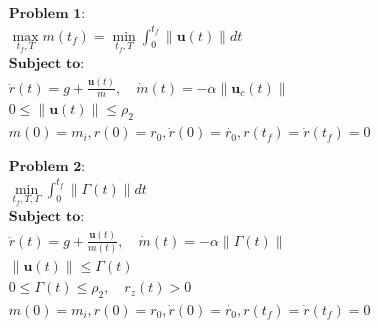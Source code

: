 \documentclass[conf]{new-aiaa}
\begin{document}
\begin{doublespace}
\begin{singlespace}
\begin{figure}
\begin{minipage}{0.5\textwidth}
	\begin{align*}
	& \textbf{Problem 1:} \\
	& \max_{t_f, T} m(t_f) = \min_{t_f, T}\int^{t_f}_0 \| \mathbf{u}(t)\| dt \\
	& \textbf{Subject to:} \\
	& \ddot{r}(t)= g + \frac{\boldsymbol u (t)}{m}, \quad \dot{m}(t)=-\alpha \| \mathbf{u}_c (t)\| \\
	& 0 \leq \lVert \mathbf{u} (t) \rVert \leq \rho_2 \\
	& m(0) = m_i, r(0) = r_0, \dot{r}(0) = \dot{r_0}, r(t_f) =\dot{r}(t_f) = 0
	\end{align*}
\end{minipage}
\begin{minipage}{0.5\textwidth}
	\begin{align*}
	& \textbf{Problem 2:} \\
	& \min_{t_f, T, \Gamma} \int^{t_f}_0 \| \Gamma(t) \| dt \\
	& \textbf{Subject to:} \\
	& \ddot{r}(t)= g + \frac{\mathbf{u} (t)}{m(t)}, \quad \dot{m}(t)=-\alpha \| \Gamma (t) \| \\
	& \| \mathbf{u}(t) \| \leq \Gamma(t) \\ 
	& 0 \leq \Gamma(t) \leq  \rho_2, \quad  r_z(t) > 0 \\
	& m(0) = m_i, r(0) = r_0, \dot{r}(0) = \dot{r_0}, r(t_f) =\dot{r}(t_f) = 0
	\end{align*}
\end{minipage}
\end{figure}
\end{singlespace}


\end{doublespace}
\end{document}
